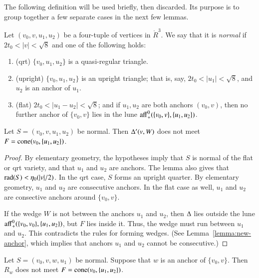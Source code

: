 The following definition will be used briefly, then discarded.
Its purpose is to group together a few separate cases in the next
few lemmas.

\begin{definition}  Let $(v_0,v,u_1,u_2)$ be a four-tuple of vertices
in $\ring{R}^3$.  We say that it is {\it normal} if $2t_0<|v|<\sqrt8$
and one of the
following holds:
\begin{enumerate}
  \item (qrt) $\{v_0,u_1,u_2\}$ is a quasi-regular triangle.
  \item (upright) $\{v_0,u_1,u_2\}$ is an upright triangle; that is, say,
    $2t_0 < |u_1| < \sqrt8$, and $u_2$ is an anchor of $u_1$.
  \item (flat)
   $2t_0<|u_1-u_2|<\sqrt8$; and if $u_1,u_2$ are both anchors $(v_0,v)$, 
   then
    no further anchor of $\{v_0,v\}$
   lies in the lune ${\operatorname{aff}}^0_+(\{v_0,v\},\{u_1,u_2\})$.
\end{enumerate}
\end{definition}

\begin{lemma}\label{lemma:BigD-}  Let $S=(v_0,v,u_1,u_2)$ be normal.
Then
$\Delta'(v,W)$ does not meet $F={\operatorname{cone}}(v_0,\{u_1,u_2\})$.
\end{lemma}

\begin{proof}  By elementary geometry, 
the hypotheses imply
that $S$ is normal of the flat or qrt variety, and 
that $u_1$ and $u_2$ are anchors.  The lemma also
gives that 
$\operatorname{rad}(S)<\eta_0(|v|/2)$.    
In the qrt case, $S$ forms
an upright quarter.  By elementary geometry, $u_1$ and $u_2$
are consecutive anchors. In the flat case as well, 
$u_1$ and $u_2$ are consective
anchors around $\{v_0,v\}$.

If the wedge $W$ is not between
the anchors $u_1$ and $u_2$, then $\Delta$ lies outside the 
lune ${\operatorname{aff}}_+^0(\{v_0,v_0\},\{u_1,u_2\})$, but $F$ lies inside it.  Thus,
the wedge must run between $u_1$ and $u_2$.   This contradicts 
the rules for forming wedges.  (See
Lemma~\ref{lemma:new-anchor}, which implies that
anchors $u_1$ and $u_2$ cannot be consecutive.)
\end{proof}

\begin{lemma}\label{lemma:fine-Rw}
Let $S=(v_0,v,w,u_1)$ be normal.
Suppose that $w$ is an anchor of $\{v_0,v\}$.
Then
$R_w$
does not meet $F={\operatorname{cone}}(v_0,\{u_1,u_2\})$.
\end{lemma}

